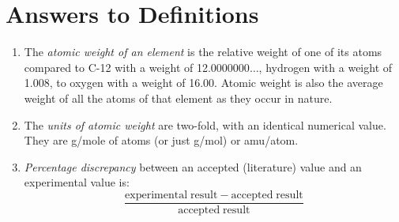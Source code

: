 \documentclass[
	a4paper, %
	12pt, %
]{CSUniSchoolLabReport}
\begin{document}

\section{Answers to Definitions}

\begin{enumerate}
	\item The \textit{atomic weight of an element} is the relative weight of one of its atoms compared to C-12 with a weight of 12.0000000$\ldots$, hydrogen with a weight of 1.008, to oxygen with a weight of 16.00. Atomic weight is also the average weight of all the atoms of that element as they occur in nature.
	\item The \textit{units of atomic weight} are two-fold, with an identical numerical value. They are g/mole of atoms (or just g/mol) or amu/atom.
	\item \textit{Percentage discrepancy} between an accepted (literature) value and an experimental value is:
		\begin{equation*}
			\frac{\mathrm{experimental\;result} - \mathrm{accepted\;result}}{\mathrm{accepted\;result}}
		\end{equation*}
\end{enumerate}

\end{document}
